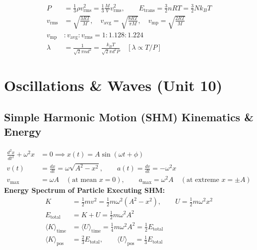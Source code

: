\documentclass[10pt,twoside,openright]{book}
\begin{document}
\begin{formulabox}
\begin{align}
  P &= \frac{1}{3}\rho v_{\text{rms}}^2 = \frac{1}{3}\frac{M}{V}v_{\text{rms}}^2, \qquad E_{\text{trans}} = \frac{3}{2}n R T = \frac{3}{2}N k_B T \\
  v_{\text{rms}} &= \sqrt{\frac{3RT}{M}}, \quad v_{\text{avg}} = \sqrt{\frac{8RT}{\pi M}}, \quad v_{\text{mp}} = \sqrt{\frac{2RT}{M}} \\
  v_{\text{mp}} &: v_{\text{avg}} : v_{\text{rms}} = 1 : 1.128 : 1.224 \\
  \lambda &= \frac{1}{\sqrt{2}\pi n d^2} = \frac{k_B T}{\sqrt{2}\pi d^2 P} \quad [\lambda \propto T/P]
\end{align}
\end{formulabox}

\newpage

\section{Oscillations \& Waves (Unit 10)}

\subsection{Simple Harmonic Motion (SHM) Kinematics \& Energy}

\begin{formulabox}
\begin{align}
  \frac{d^2 x}{dt^2} + \omega^2 x &= 0 \implies x(t) = A\sin(\omega t + \phi) \\
  v(t) &= \frac{dx}{dt} = \omega\sqrt{A^2 - x^2}, \qquad a(t) = \frac{dv}{dt} = -\omega^2 x \\
  v_{\max} &= \omega A \quad (\text{at mean } x=0), \qquad a_{\max} = \omega^2 A \quad (\text{at extreme } x=\pm A)
\end{align}
\textbf{Energy Spectrum of Particle Executing SHM:}
\begin{align}
  K &= \frac{1}{2}m v^2 = \frac{1}{2}m\omega^2(A^2 - x^2), \qquad U = \frac{1}{2}m\omega^2 x^2 \\
  E_{\text{total}} &= K + U = \frac{1}{2}m\omega^2 A^2 \\
  \langle K \rangle_{\text{time}} &= \langle U \rangle_{\text{time}} = \frac{1}{4}m\omega^2 A^2 = \frac{1}{2}E_{\text{total}} \\
  \langle K \rangle_{\text{pos}} &= \frac{2}{3}E_{\text{total}}, \qquad \langle U \rangle_{\text{pos}} = \frac{1}{3}E_{\text{total}}
\end{align}
\end{formulabox}
\end{document}
